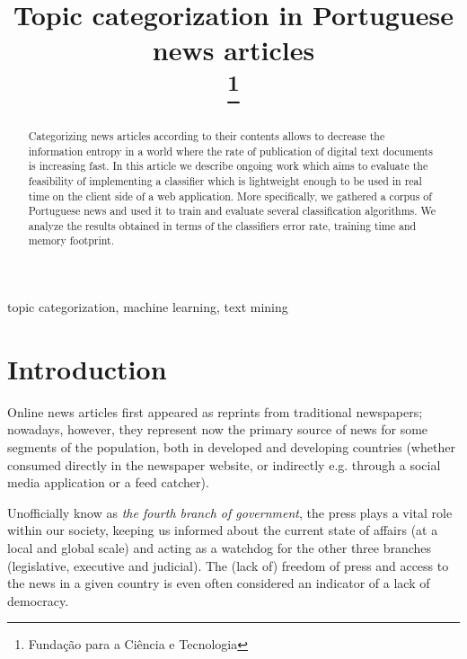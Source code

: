 \documentclass[conference]{IEEEtran}
\begin{document}

\title{Topic categorization in Portuguese news articles\\
\thanks{Fundação para a Ciência e Tecnologia} }


\author{
 }

\maketitle

\begin{abstract}
Categorizing news articles according to their contents allows to
decrease the information entropy in a world where the rate of
publication of digital text documents is increasing fast. In this
article we describe ongoing work which aims to evaluate the
feasibility of implementing a classifier which is lightweight
enough to be used in real time on the client side of a web
application.  More specifically, we gathered a corpus of Portuguese
news and used it to train and evaluate several classification
algorithms. We analyze the results obtained in terms of the
classifiers error rate, training time and memory footprint.
\end{abstract}

\begin{IEEEkeywords} topic categorization, machine learning, text
mining \end{IEEEkeywords}

\section{Introduction}
Online news articles first appeared as reprints from traditional
newspapers; nowadays, however, they represent now the primary source
of news for some segments of the population, both in developed and
developing countries (whether consumed directly in the newspaper
website, or indirectly e.g. through a social media application or a
feed catcher)\cite{greer2006evolution,boczkowski2005digitizing,chyi1999access}.

Unofficially know as \emph{the fourth branch of government}, the press
plays a vital role within our society, keeping us informed about
the current state of affairs (at a local and global scale) and acting
as a watchdog for the other three branches (legislative, executive and
judicial). The (lack of) freedom of press and access to the news in a
given country is even often considered an indicator of a lack of
democracy\cite{goode2009social,house2009freedom}.
\end{document}
